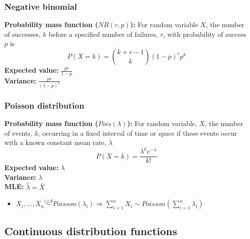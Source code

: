 \documentclass{article}
\begin{document}
\subsubsection{Negative binomial}
\textbf{Probability mass function ($NB(r, p)$):} For random variable $X$, the number of successes, $k$ before a specified number of failures, $r$, with probability of success $p$ is
\begin{equation*}
	P(X = k) = {k + r - 1 \choose k} (1-p)^rp^k
\end{equation*}
\textbf{Expected value:} $\frac{pr}{1-p}$\\
\textbf{Variance:} $\frac{pr}{(1 - p)^2}$

\subsubsection{Poisson distribution}
\textbf{Probability mass function ($Pois(\lambda)$):} For random variable, $X$, the number of events, $k$, occurring in a fixed interval of time or space if these events occur with a known constant mean rate, $\lambda$
\begin{equation*}
	P(X = k) = \frac{\lambda^ke^{-\lambda}}{k!}
\end{equation*}
\textbf{Expected value:} $\lambda$\\
\textbf{Variance:} $\lambda$\\
\textbf{MLE:} $\hat{\lambda} = \bar{X}$
\begin{itemize}
    \item $X_i, \dots, X_n \overset{i.i.d}{\sim} Poisson(\lambda_i) \Longrightarrow \sum_{i=1}^nX_i \sim Poisson\left(\sum_{i=1}^n \lambda_i \right)$
\end{itemize}


\subsection{Continuous distribution functions}
\end{document}
